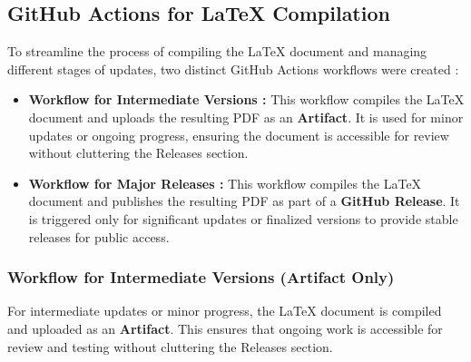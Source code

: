 \documentclass[12pt]{article}
\begin{document}
\subsection{GitHub Actions for LaTeX Compilation}

To streamline the process of compiling the LaTeX document and managing different stages of updates, two distinct GitHub Actions workflows were created :

\begin{itemize}
    \item \textbf{Workflow for Intermediate Versions :}
    This workflow compiles the LaTeX document and uploads the resulting PDF as an \textbf{Artifact}. It is used for minor updates or ongoing progress, ensuring the document is accessible for review without cluttering the Releases section.
    
    \item \textbf{Workflow for Major Releases :}
    This workflow compiles the LaTeX document and publishes the resulting PDF as part of a \textbf{GitHub Release}. It is triggered only for significant updates or finalized versions to provide stable releases for public access.
\end{itemize}

\subsubsection*{Workflow for Intermediate Versions (Artifact Only)}

For intermediate updates or minor progress, the LaTeX document is compiled and uploaded as an \textbf{Artifact}. This ensures that ongoing work is accessible for review and testing without cluttering the Releases section.
\end{document}
